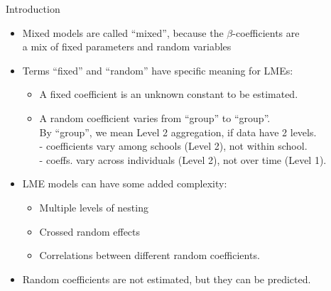 \documentclass{beamer}
\begin{document}
\begin{frame}{Introduction}
\begin{itemize}
\item Mixed models are called ``mixed'', because the $\beta$-coefficients are \\a mix of fixed parameters and random variables
\smallskip 
\item Terms ``fixed'' and ``random'' have specific meaning for LMEs:\\ \smallskip
\begin{itemize}
\item A fixed coefficient is an unknown constant to be estimated. \smallskip
\item A random coefficient varies from ``group'' to ``group''. \\By ``group'', we mean Level 2 aggregation, if data have 2 levels. \\ - coefficients vary among schools (Level 2), not within school.\\
- coeffs. vary across individuals (Level 2), not over time (Level 1).
\end{itemize}
\smallskip
\item  LME models can have some added complexity:
\smallskip
\begin{itemize}
\item Multiple levels of nesting
\smallskip
\item Crossed random effects
\smallskip
\item Correlations between different random coefficients.


\end{itemize}
\smallskip
\item Random  coefficients are not estimated, but they can be predicted.
\end{itemize}
\end{frame}
\end{document}
